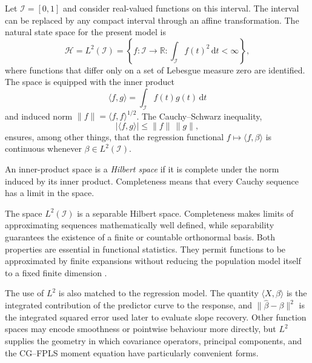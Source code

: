 Let $\mathcal I=[0,1]$ and consider real-valued functions on this interval. The interval can be replaced by any compact interval through an affine transformation. The natural state space for the present model is
\begin{equation}
    \mathcal H=L^2(\mathcal I)
    =\left\{f:\mathcal I\rightarrow\mathbb R:
      \int_{\mathcal I}f(t)^2\,\mathrm dt<\infty\right\},
    \label{eq:l2-space}
\end{equation}
where functions that differ only on a set of Lebesgue measure zero are identified. The space is equipped with the inner product
\begin{equation}
    \langle f,g\rangle
    =\int_{\mathcal I}f(t)g(t)\,\mathrm dt
    \label{eq:l2-inner-product}
\end{equation}
and induced norm $\|f\|=\langle f,f\rangle^{1/2}$. The Cauchy--Schwarz inequality,
\begin{equation}
    |\langle f,g\rangle|\leq \|f\|\,\|g\|,
    \label{eq:cauchy-schwarz}
\end{equation}
ensures, among other things, that the regression functional $f\mapsto\langle f,\beta\rangle$ is continuous whenever $\beta\in L^2(\mathcal I)$.

\begin{definition}
An inner-product space is a \emph{Hilbert space} if it is complete under the norm induced by its inner product. Completeness means that every Cauchy sequence has a limit in the space.
\end{definition}

The space $L^2(\mathcal I)$ is a separable Hilbert space. Completeness makes limits of approximating sequences mathematically well defined, while separability guarantees the existence of a finite or countable orthonormal basis. Both properties are essential in functional statistics. They permit functions to be approximated by finite expansions without reducing the population model itself to a fixed finite dimension \parencite{lin_mit_18102_2021,hsing_eubank_2015}.

The use of $L^2$ is also matched to the regression model. The quantity $\langle X,\beta\rangle$ is the integrated contribution of the predictor curve to the response, and $\|\widehat\beta-\beta\|^2$ is the integrated squared error used later to evaluate slope recovery. Other function spaces may encode smoothness or pointwise behaviour more directly, but $L^2$ supplies the geometry in which covariance operators, principal components, and the CG--FPLS moment equation have particularly convenient forms.

